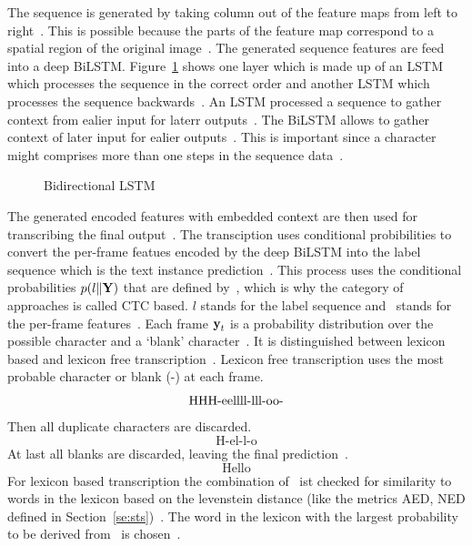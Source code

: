 The sequence is generated by taking column out of the feature maps from left to
right~\citep{shi_end--end_2017}.
This is possible because the parts of the feature map correspond to a spatial region of the
original image~\citep{shi_end--end_2017,goodfellow_deep_2016}.
The generated sequence features are feed into a deep \ac{BiLSTM}.
Figure~\ref{fig:bilstm} shows one layer which is made up of an \ac{LSTM} which processes the
sequence in the correct order and another \ac{LSTM} which processes the sequence
backwards~\citep{shi_end--end_2017}.
An \ac{LSTM} processed a sequence to gather context from ealier input for laterr
outputs~\citep{shi_end--end_2017,goodfellow_deep_2016}.
The \ac{BiLSTM} allows to gather context of later input for ealier outputs~\citep{shi_end--end_2017}.
This is important since a character might comprises more than one steps in the sequence
data~\citep{shi_end--end_2017}.
\begin{figure}[ht]
    \centering
    \caption[Bidirectional LSTM]{%
        Bidirectional LSTM~\citep{goodfellow_deep_2016}\label{fig:bilstm}
    }
\end{figure}
The generated encoded features with embedded context are then used for transcribing the final
output~\citep{shi_end--end_2017}.
The transciption uses conditional probibilities to convert the per-frame featues encoded by the
deep \ac{BiLSTM} into the label sequence which is the text instance
prediction~\citep{shi_end--end_2017}.
This process uses the conditional probabilities $p(l\|\textbf{Y})$ that are defined
by~\cite{graves_connectionist_2006}, which is why the category of approaches is called
\ac{CTC} based.
$l$ stands for the label sequence and \Y\ stands for the per-frame features~\citep{shi_end--end_2017}.
Each frame $\textbf{y}_t$ is a probability distribution over the possible character and a `blank'
character~\citep{shi_end--end_2017,graves_connectionist_2006}.
It is distinguished between lexicon based and lexicon free transcription~\citep{shi_end--end_2017}.
Lexicon free transcription uses the most probable character or blank (-) at each frame.
\[\text{HHH-eellll-lll-\-oo-\-\-}\]
Then all duplicate characters are discarded.
\[\text{H-el-l-o}\]
At last all blanks are discarded, leaving the final prediction~\citep{shi_end--end_2017}.
\[\text{Hello}\]
For lexicon based transcription the combination of \Y\ ist checked for similarity to words in the
lexicon based on the levenstein distance (like the metrics \ac{AED}, \ac{NED} defined in
Section~\ref{se:sts})~\citep{shi_end--end_2017}.
The word in the lexicon with the largest probability to be derived from \Y\ is
chosen~\citep{shi_end--end_2017}.

